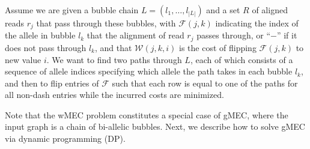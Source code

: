 % 

\begin{problem}\label{prob:gMEC}
Assume we are given a bubble chain $L=(l_1,\ldots,l_{|L|})$ and a set $R$ of aligned reads $r_j$ that pass through these bubbles, with $\mathcal{F}(j,k)$ indicating the index of the allele in bubble $l_k$ that the alignment of read $r_j$ passes through, or ``$-$'' if it does not pass through $l_k$, and that $\mathcal{W}(j,k,i)$ is the cost of flipping $\mathcal{F}(j,k)$ to new value $i$.  
We want to find two paths through $L$, each of which consists of a sequence of allele indices specifying which allele the path takes in each bubble $l_k$, and then to flip entries of $\mathcal{F}$ such that each row is equal to one of the paths for all non-dash entries while the incurred costs are minimized.
\end{problem}
Note that the wMEC problem constitutes a special case of gMEC, where the input graph is a chain of bi-allelic bubbles.
Next, we describe how to solve gMEC via dynamic programming (DP).

